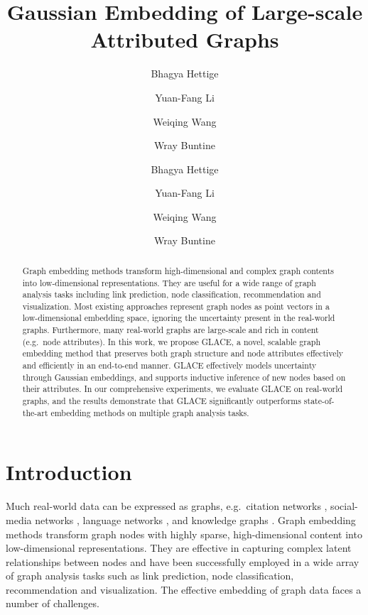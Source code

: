 \documentclass[runningheads]{llncs}
\begin{document}
\title{Gaussian Embedding of Large-scale\\ Attributed Graphs}

\author{Bhagya Hettige \and Yuan-Fang Li \and Weiqing Wang \and Wray Buntine }

\author{Bhagya Hettige \and
Yuan-Fang Li \and
Weiqing Wang \and Wray Buntine}



\maketitle              

\begin{abstract}
Graph embedding methods transform high-dimensional and complex graph contents into low-dimensional representations. 
They are useful for a wide range of graph analysis tasks including link prediction, node classification, recommendation and visualization. 
Most existing approaches represent graph nodes as point vectors in a low-dimensional embedding space, ignoring the uncertainty present in the real-world graphs. 
Furthermore, many real-world graphs are large-scale and rich in content (e.g.\ node attributes). 
In this work, we propose GLACE, a novel, scalable graph embedding method that preserves both graph structure and node attributes effectively and efficiently in an end-to-end manner. 
GLACE effectively models uncertainty through Gaussian embeddings, and supports inductive inference of new nodes based on their attributes. 
In our comprehensive experiments, we evaluate GLACE on real-world graphs, and the results demonstrate that GLACE significantly outperforms state-of-the-art embedding methods on multiple graph analysis tasks.

\end{abstract}

\section{Introduction}

Much real-world data can be expressed as graphs, e.g.\ citation networks \cite{g2g,DBLP:graphsage,DBLP:line}, social-media networks \cite{social1}, language networks \cite{DBLP:PTE,DBLP:line}, and knowledge graphs \cite{DBLP:kg1}.
Graph embedding methods transform graph nodes with highly sparse, high-dimensional content into low-dimensional representations. 
They are effective in capturing complex latent relationships between nodes \cite{DBLP:node2vec,DBLP:graphsage,DBLP:deepwalk,DBLP:line} and have been successfully employed in a wide array of graph analysis tasks such as link prediction, node classification, recommendation and visualization. 
The effective embedding of graph data faces a number of challenges. 
\end{document}
